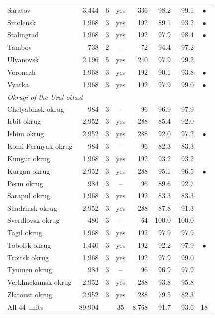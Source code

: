 \begin{tabular}{lrrcrrrc}
Saratov & 3,444 & 6 & yes & 336 & 98.2 & 99.1 & $\bullet$ \\
Smolensk & 1,968 & 3 & yes & 192 & 89.1 & 93.2 & $\bullet$ \\
Stalingrad & 1,968 & 3 & yes & 192 & 97.9 & 98.4 & $\bullet$ \\
Tambov & 738 & 2 & -- & 72 & 94.4 & 97.2 &  \\
Ulyanovsk & 2,196 & 5 & yes & 240 & 97.9 & 99.2 &  \\
Voronezh & 1,968 & 3 & yes & 192 & 90.1 & 93.8 & $\bullet$ \\
Vyatka & 1,968 & 3 & yes & 192 & 97.9 & 99.0 & $\bullet$ \\
\multicolumn{8}{l}{\textit{\emph{Okrugi} of the Ural oblast}} \\
Chelyabinsk okrug & 984 & 3 & -- & 96 & 96.9 & 97.9 &  \\
Irbit okrug & 2,952 & 3 & yes & 288 & 85.4 & 92.0 &  \\
Ishim okrug & 2,952 & 3 & yes & 288 & 92.0 & 97.2 & $\bullet$ \\
Komi-Permyak okrug & 984 & 3 & -- & 96 & 82.3 & 83.3 &  \\
Kungur okrug & 1,968 & 3 & yes & 192 & 93.2 & 93.2 &  \\
Kurgan okrug & 2,952 & 3 & yes & 288 & 95.1 & 96.5 & $\bullet$ \\
Perm okrug & 984 & 3 & -- & 96 & 89.6 & 92.7 &  \\
Sarapul okrug & 1,968 & 3 & yes & 192 & 83.3 & 83.3 &  \\
Shadrinsk okrug & 2,952 & 3 & yes & 288 & 87.8 & 91.3 &  \\
Sverdlovsk okrug & 480 & 3 & -- & 64 & 100.0 & 100.0 &  \\
Tagil okrug & 1,968 & 3 & yes & 192 & 97.9 & 97.9 &  \\
Tobolsk okrug & 1,440 & 3 & yes & 192 & 92.2 & 97.9 & $\bullet$ \\
Troitsk okrug & 1,968 & 3 & yes & 192 & 97.9 & 99.0 &  \\
Tyumen okrug & 984 & 3 & -- & 96 & 96.9 & 97.9 &  \\
Verkhnekamsk okrug & 2,952 & 3 & yes & 288 & 93.8 & 95.8 &  \\
Zlatoust okrug & 2,952 & 3 & yes & 288 & 79.5 & 82.3 &  \\
\midrule
All 44 units & 89,904 & & 35 & 8,768 & 91.7 & 93.6 & 18 \\
\bottomrule
\end{tabular}
